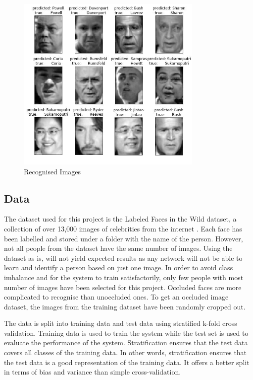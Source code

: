 \documentclass[conference]{IEEEtran}
\begin{document}
\begin{enumerate}
\begin{figure}[h!]
 \centering
 \includegraphics[width = 9cm]{PCA_pred.JPG}
 \caption{Recognised Images}
 \label{fig 4: Ouput}
\end{figure}


\subsection{Data} 
\label{subsec: 4a. Data}
The dataset used for this project is the Labeled Faces in the Wild dataset, a collection of over 13,000 images of celebrities from the internet \cite{LFWTech}. Each face has been labelled and stored under a folder with the name of the person. However, not all people from the dataset have the same number of images. Using the dataset as is, will not yield expected results as any network will not be able to learn and identify a person based on just one image. In order to avoid class imbalance and for the system to train satisfactorily, only few people with most number of images have been selected for this project. Occluded faces are more complicated to recognise than unoccluded ones. To get an occluded image dataset, the images from the training dataset have been randomly cropped out. 

The data is split into training data and test data using stratified k-fold cross validation. Training data is used to train the system while the test set is used to evaluate the performance of the system. Stratification ensures that the test data covers all classes of the training data. In other words, stratification ensures that the test data is a good representation of the training data. It offers a better split in terms of bias and variance than simple cross-validation. 



\end{enumerate}
\end{document}
